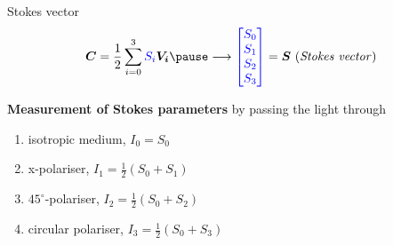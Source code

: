 \documentclass[12pt, dvipsnames]{beamer}
\numberwithin{equation}{section}
\begin{document}
\begin{frame}{Stokes vector}
	$$\boldsymbol{C} = \frac{1}{2} \sum_{i=0}^{3} {\color{blue}S_i} \boldsymbol{V_i}\pause \longrightarrow {\color{blue}\begin{bmatrix} S_0\\ S_1\\ S_2\\S_3\end{bmatrix}} = \boldsymbol{S} \text{ (\textit{Stokes vector})}$$\pause


\textbf{Measurement of Stokes parameters} by passing the light through
\begin{enumerate}
	\item isotropic medium, $I_0 = S_0$
	\item x-polariser, $I_1 = \frac{1}{2} (S_0+S_1)$
	\item $45^\circ$-polariser, $I_2 = \frac{1}{2} (S_0+S_2)$
	\item circular polariser, $I_3 = \frac{1}{2} (S_0+S_3)$
\end{enumerate}

\end{frame}
\end{document}
